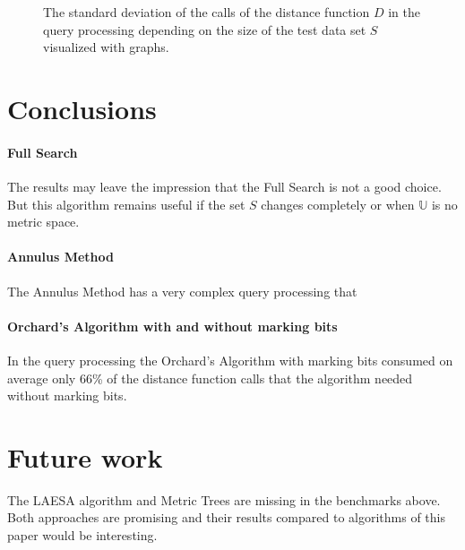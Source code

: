 \documentclass[runningheads,a4paper]{llncs}
\begin{document}
\begin{figure}
	\begin{center}
	\end{center}
	\caption{The standard deviation of the calls of the distance function $D$ in the query processing depending on the
		size of the test data set $S$ visualized with graphs.}
	\label{fig:standarddeviation:graph}
\end{figure}

\section{Conclusions}

\paragraph{Full Search} The results may leave the impression that the Full Search is not a good choice. But this
algorithm remains useful if the set $S$ changes completely or when $\mathbb{U}$ is no metric space.

\paragraph{Annulus Method} The Annulus Method has a very complex query processing that

\paragraph{Orchard’s Algorithm with and without marking bits} In the query processing the Orchard’s Algorithm with
marking bits consumed on average only 66\% of the distance function calls that the algorithm needed without marking
bits.

\section{Future work}

The LAESA algorithm and Metric Trees are missing in the benchmarks above. Both approaches are promising and their
results compared to algorithms of this paper would be interesting.
\end{document}
